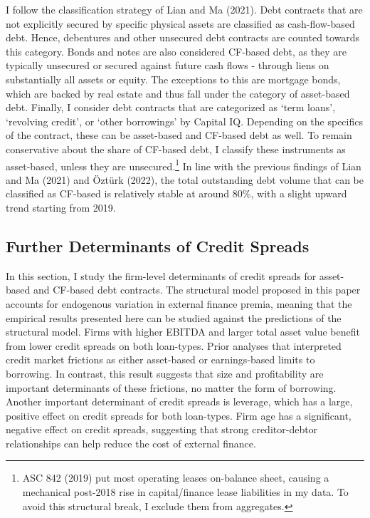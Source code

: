 \documentclass[12pt]{article}
\begin{document}
I follow the classification strategy of Lian and Ma (2021). Debt contracts that are not explicitly secured by specific physical assets are classified as cash-flow-based debt. Hence, debentures and other unsecured debt contracts are counted towards this category. Bonds and notes are also considered CF-based debt, as they are typically unsecured or secured against future cash flows - through liens on substantially all assets or equity. The exceptions to this are mortgage bonds, which are backed by real estate and thus fall under the category of asset-based debt. Finally, I consider debt contracts that are categorized as `term loans', `revolving credit', or `other borrowings' by Capital IQ. Depending on the specifics of the contract, these can be asset-based and CF-based debt as well. To remain conservative about the share of CF-based debt, I classify these instruments as asset-based, unless they are unsecured.\footnote{ASC 842 (2019) put most operating leases on-balance sheet, causing a mechanical post-2018 rise in capital/finance lease liabilities in my data. To avoid this structural break, I exclude them from aggregates.} In line with the previous findings of Lian and Ma (2021) and Öztürk (2022), the total outstanding debt volume that can be classified as CF-based is relatively stable at around 80\%, with a slight upward trend starting from 2019.

\subsection{Further Determinants of Credit Spreads \label{sec:credit spreads}} 
In this section, I study the firm-level determinants of credit spreads for asset-based and CF-based debt contracts. The structural model proposed in this paper accounts for endogenous variation in external finance premia, meaning that the empirical results presented here can be studied against the predictions of the structural model. Firms with higher EBITDA and larger total asset value benefit from lower credit spreads on both loan-types. Prior analyses that interpreted credit market frictions as either asset-based or earnings-based limits to borrowing. In contrast, this result suggests that size and profitability are important determinants of these frictions, no matter the form of borrowing. Another important determinant of credit spreads is leverage, which has a large, positive effect on credit spreads for both loan-types. Firm age has a significant, negative effect on credit spreads, suggesting that strong creditor-debtor relationships can help reduce the cost of external finance. 
\end{document}

